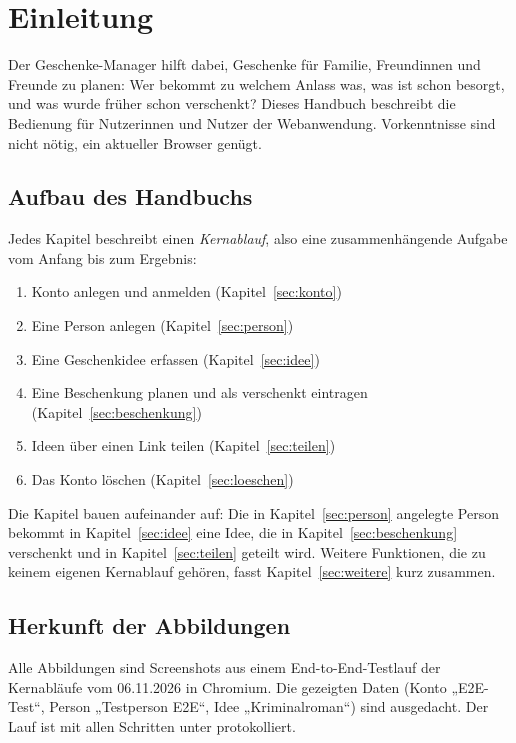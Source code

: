 \documentclass[11pt,a4paper]{article}
\begin{document}
\section{Einleitung}

Der Geschenke-Manager hilft dabei, Geschenke für Familie, Freundinnen und Freunde zu planen: Wer bekommt zu welchem Anlass was, was ist schon besorgt, und was wurde früher schon verschenkt? Dieses Handbuch beschreibt die Bedienung für Nutzerinnen und Nutzer der Webanwendung. Vorkenntnisse sind nicht nötig, ein aktueller Browser genügt.

\subsection{Aufbau des Handbuchs}

Jedes Kapitel beschreibt einen \emph{Kernablauf}, also eine zusammenhängende Aufgabe vom Anfang bis zum Ergebnis:

\begin{enumerate}
  \item Konto anlegen und anmelden (Kapitel~\ref{sec:konto})
  \item Eine Person anlegen (Kapitel~\ref{sec:person})
  \item Eine Geschenkidee erfassen (Kapitel~\ref{sec:idee})
  \item Eine Beschenkung planen und als verschenkt eintragen (Kapitel~\ref{sec:beschenkung})
  \item Ideen über einen Link teilen (Kapitel~\ref{sec:teilen})
  \item Das Konto löschen (Kapitel~\ref{sec:loeschen})
\end{enumerate}

Die Kapitel bauen aufeinander auf: Die in Kapitel~\ref{sec:person} angelegte Person bekommt in Kapitel~\ref{sec:idee} eine Idee, die in Kapitel~\ref{sec:beschenkung} verschenkt und in Kapitel~\ref{sec:teilen} geteilt wird. Weitere Funktionen, die zu keinem eigenen Kernablauf gehören, fasst Kapitel~\ref{sec:weitere} kurz zusammen.

\subsection{Herkunft der Abbildungen}

Alle Abbildungen sind Screenshots aus einem End-to-End-Testlauf der Kernabläufe vom 06.11.2026 in Chromium. Die gezeigten Daten (Konto „E2E-Test“, Person „Testperson E2E“, Idee „Kriminalroman“) sind ausgedacht. Der Lauf ist mit allen Schritten unter  protokolliert.
\end{document}
